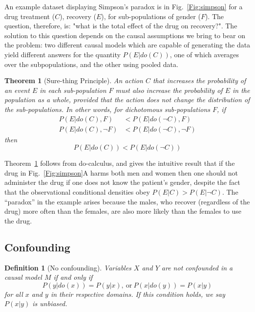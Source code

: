 \documentclass[11pt]{article}
\numberwithin{equation}{section}
\newtheorem{thm}{Theorem}[section]
\newtheorem{defn}{Definition}[section]
\begin{document}
An example dataset displaying Simpson's paradox is in Fig.~\ref{Fig:simpson} for a drug treatment ($C$), recovery ($E$), for sub-populations of gender ($F$). The question, therefore, is: "what is the total effect of the drug on recovery?". The solution to this question depends on the causal assumptions we bring to bear on the problem: two different causal models which are capable of generating the data yield different answers for the quantity $P(E|do(C))$, one of which averages over the subpopulations, and the other using pooled data. 

\begin{thm}[Sure-thing Principle]
An action $C$ that increases the probability of an event $E$ in each sub-population $F$ must also increase the probability of $E$ in the population as a whole, provided that the action does not change the distribution of the sub-populations. In other words, for dichotomous sub-populations $F$, if  \label{thm:sure-thing}
\begin{align}
P(E|do(C), F) &< P(E|do(\neg C), F) \\
P(E|do(C), \neg F) &< P(E|do(\neg C), \neg F) \nonumber
\end{align}
then
\begin{equation}
P(E|do(C)) < P(E|do(\neg C))
\end{equation}
\end{thm}

Theorem~\ref{thm:sure-thing} follows from do-calculus, and gives the intuitive result that if the drug in Fig.~\ref{Fig:simpson}A harms both men and women then one should not administer the drug if one does not know the patient's gender, despite the fact that the observational conditional densities obey $P(E|C)>P(E|\neg C)$. The ``paradox'' in the example arises because the males, who recover (regardless of the drug) more often than the females, are also more likely than the females to use the drug.

\subsection{Confounding}

\begin{defn}[No confounding] \label{def:no-confounding}
Variables $X$ and $Y$ are not confounded in a causal model $M$ if and only if
\begin{equation}
P(y|do(x)) = P(y|x),\ \text{or}\ P(x|do(y)) = P(x|y)
\end{equation}
for all $x$ and $y$ in their respective domains. If this condition holds, we say $P(x|y)$ is unbiased. 
\end{defn}
\end{document}
